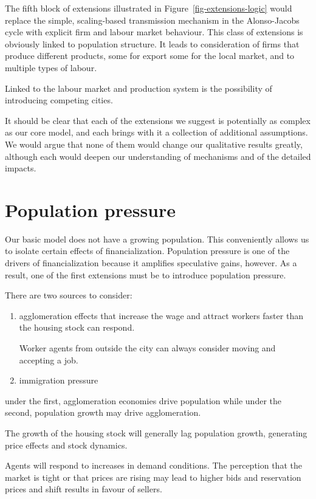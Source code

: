 The fifth block of extensions illustrated in Figure~\ref{fig-extensions-logic} would replace the simple, scaling-based transmission mechanism in the Alonso-Jacobs cycle with explicit firm and labour market behaviour. This class of extensions is obviously linked to population structure. It leads to consideration of firms that produce different products, some for export some for the local market, and to multiple types of labour.

Linked to the labour market and production system is the possibility of introducing competing cities. 

It should be clear that each of the extensions we suggest is potentially as complex as our core model, and each brings with it a collection of additional assumptions. We would argue that none of them would change our qualitative results greatly, although each would deepen our understanding of mechanisms and of the detailed impacts.


\section{Population pressure } 
Our basic model does not have a growing population. This conveniently allows us to isolate certain effects of financialization. Population pressure is one of the drivers of financialization because it amplifies speculative gains, however. As a result, one of the first extensions must be  to introduce population pressure.

There are two sources to consider: 
\begin{enumerate}
\item agglomeration effects that increase the wage and attract workers faster than the housing stock can respond. 

Worker agents from outside the city can always consider moving and accepting a job. 
\item immigration pressure
\end{enumerate}
under the  first, agglomeration economies drive population while under the second, population growth may drive agglomeration.

The growth of the housing stock will generally lag population growth, generating price effects and stock dynamics.

Agents will respond to increases in demand conditions. The perception that the market is tight or that prices are rising may lead to higher bids and reservation prices and shift results in favour of sellers.  


